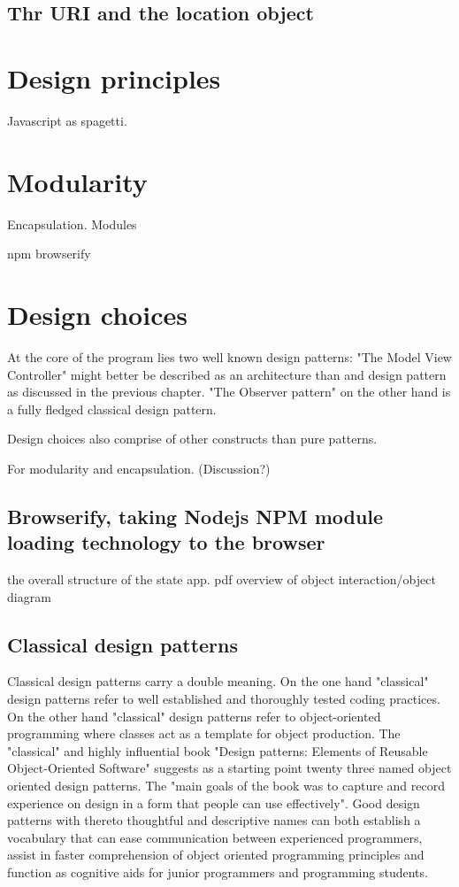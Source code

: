 \documentclass[english]{ifimaster}
\begin{document}
\subsection{Thr URI and the location object}
\section{Design principles}
Javascript as spagetti.
\section{Modularity}
Encapsulation.
Modules

npm
browserify

\section{Design choices}

At the core of the program lies two well known design patterns: "The Model View Controller" might better be described as an architecture than and design pattern as discussed in the previous chapter. "The Observer pattern" on the other hand is a fully fledged classical design pattern.

Design choices also comprise of other constructs than pure patterns.


For modularity and encapsulation. (Discussion?)
\subsection{Browserify, taking Nodejs NPM module loading technology to the browser}

the overall structure of the state app.
pdf overview of object interaction/object diagram

\subsection{Classical design patterns}
Classical design patterns carry a double meaning. On the one hand "classical" design patterns refer to well established and thoroughly tested coding practices\parencite[p. 12]{gamma}. On the other hand "classical" design patterns refer to object-oriented programming where classes act as a template for object production\parencite[p. 115]{stefanov}. The "classical" and highly influential book "Design patterns: Elements of Reusable Object-Oriented Software" suggests as a starting point twenty three named object oriented design patterns. The "main goals of the book was to capture and record experience on design in a form that people can use effectively"\parencite[p. 12]{gamma}. Good design patterns with thereto thoughtful and descriptive names can both establish a vocabulary that can ease communication between experienced programmers, assist in faster comprehension of object oriented programming principles and function as cognitive aids for junior programmers and programming students.
\end{document}
